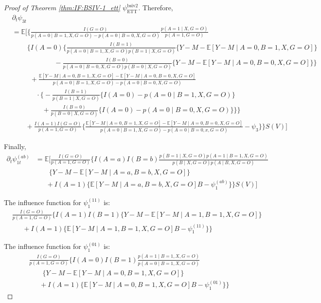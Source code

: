 \documentclass[10pt]{article}
\begin{document}
\begin{proof}[Proof of Theorem \ref{thm:IF:BSIV-1_ett} $\psi_{\text{ETT}}^{\text{bsiv2}}$]
Therefore,
{\footnotesize \begin{align*}
    &\partial_t\psi_{3t}\\
    &=\mathbb{E}\Bigg[\Bigg\{\frac{I(G=O)}{p(A=0\mid B=1,X,G=O)-p(A=0\mid B=0,X,G=O)}\frac{p(A=1\mid X, G=O)}{p(A=1,G=O)}\\
    &\ \ \ \ \ \ \ \ \ \ \bigg\{I(A=0)\big\{\frac{I(B=1)}{p(A=0\mid B=1,X,G=O)p(B=1\mid X,G=O)}\{Y-M-\mathbb{E}[Y-M\mid A=0,B=1,X,G=O]\}\\
    &\ \ \ \ \ \ \ \ \ \ \ \ \ \ \ \ \ \ \ \ \ \ \ \ \ \ \ \ -\frac{I(B=0)}{p(A=0\mid B=0,X,G=O)p(B=0\mid X,G=O)}\{Y-M-\mathbb{E}[Y-M\mid A=0,B=0,X,G=O]\}\big\}\\
    &\ \ \ \ \ \ \ \ \ \ \ \ +\frac{\mathbb{E}[Y-M\mid A=0,B=1,X,G=O]-\mathbb{E}[Y-M\mid A=0,B=0,X,G=O]}{p(A=0\mid B=1,X,G=O)-p(A=0\mid B=0,X,G=O)}\\
    &\ \ \ \ \ \ \ \ \ \ \ \ \ \ \ \ \cdot\big\{-\frac{I(B=1)}{p(B=1\mid X, G=O)}\{I(A=0)-p(A=0\mid B=1,X,G=O)\}\\
    &\ \ \ \ \ \ \ \ \ \ \ \ \ \ \ \ \ \ \ \ +\frac{I(B=0)}{p(B=0\mid X, G=O)}\{I(A=0)-p(A=0\mid B=0,X,G=O)\}\big\}\bigg\}\\
    &\ \ \ \ \ \ \ \ \  +\frac{I(A=1)I(G=O)}{p(A=1,G=O)}\bigg\{\frac{\mathbb{E}[Y-M\mid A=0,B=1,X,G=O]-\mathbb{E}[Y-M\mid A=0,B=0,X,G=O]}{p(A=0\mid B=1,X,G=O)-p(A=0\mid B=0,x,G=O)}-\psi_3\bigg\}\Bigg\}S(V)\Bigg]
\end{align*}}

Finally,
\begin{align*}
    \partial_t\psi_{1t}^{(ab)}&=\mathbb{E}\bigg[\frac{I(G=O)}{p(A=1,G=O)}\bigg\{I(A=a)I(B=b)\frac{p(B=1\mid X,G=O)p(A=1\mid B=1, X, G=O)}{p(B\mid X,G=O)p(A\mid B, X,G=O)}\\
    &\ \ \ \ \ \ \ \ \ \{Y-M-\mathbb{E}[Y-M\mid A=a,B=b,X,G=O]\}\\
    &\ \ \ \ \ \ \ +I(A=1)\{\mathbb{E}[Y-M\mid A=a,B=b,X,G=O]B-\psi_1^{(ab)}\}\bigg\}S(V)\bigg]
\end{align*}

The influence function for $\psi_1^{(11)}$ is:
\begin{align*}
    &\frac{I(G=O)}{p(A=1,G=O)}\bigg\{I(A=1)I(B=1)\{Y-M-\mathbb{E}[Y-M\mid A=1,B=1,X,G=O]\}\\
    &\ \ \ \ \ \ \ +I(A=1)\{\mathbb{E}[Y-M\mid A=1,B=1,X,G=O]B-\psi_1^{(11)}\}\bigg\}
\end{align*}

The influence function for $\psi_1^{(01)}$ is:
\begin{align*}
    &\frac{I(G=O)}{p(A=1,G=O)}\bigg\{I(A=0)I(B=1)\frac{p(A=1\mid B=1, X, G=O)}{p(A=0\mid B=1, X,G=O)}\\
    &\ \ \ \ \ \ \ \ \ \{Y-M-\mathbb{E}[Y-M\mid A=0,B=1,X,G=O]\}\\
    &\ \ \ \ \ \ \ +I(A=1)\{\mathbb{E}[Y-M\mid A=0,B=1,X,G=O]B-\psi_1^{(01)}\}\bigg\}
\end{align*}


\end{proof}
\end{document}
